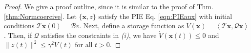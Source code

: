 \documentclass[10pt,a4paper]{amsart}
\newcommand{\ip}[2]{\left\langle #1,#2\right\rangle}
\newcommand{\mbf}[1]{\mathbf{#1}}
\newcommand{\mcl}[1]{\mathcal{#1}}
\newcommand{\norm}[1]{\lVert#1\rVert}
\begin{document}
\begin{proof}
We give a proof outline, since it is similar to the proof of Thm. \ref{thm:Normcoercive}.
Let $\{\mbf x, z\}$ satisfy the PIE Eq. \eqref{eqn:PIEaux} with initial conditions $\mcl T\mbf x(0)=\mcl Bv$. Next, define a storage function as $V(\mbf x) = \ip{\mcl T\mbf x}{\mcl Q\mbf x}$. Then, if $\mcl Q$ satisfies the constraints in \textit{(i)}, we have
$\dot{V}(\mbf x(t))\le 0$ and $\norm{z(t)}^2\le \gamma^2V(t)$ for all $t>0$.
       
    


\end{proof}
\end{document}
